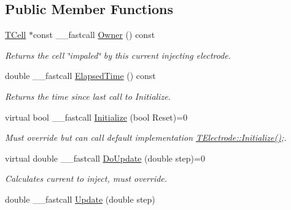 \subsection*{Public Member Functions}
\begin{DoxyCompactItemize}
\item 
\hypertarget{class_t_electrode_ae19b5798e468ff9b6c8519d391e9d2f3}{\hyperlink{class_t_cell}{T\+Cell} $\ast$const \+\_\+\+\_\+fastcall \hyperlink{class_t_electrode_ae19b5798e468ff9b6c8519d391e9d2f3}{Owner} () const }\label{class_t_electrode_ae19b5798e468ff9b6c8519d391e9d2f3}

\begin{DoxyCompactList}\small\item\em Returns the cell \char`\"{}impaled\char`\"{} by this current injecting electrode. \end{DoxyCompactList}\item 
\hypertarget{class_t_electrode_add43f5bb0a835ca9650312de714597db}{double \+\_\+\+\_\+fastcall \hyperlink{class_t_electrode_add43f5bb0a835ca9650312de714597db}{Elapsed\+Time} () const }\label{class_t_electrode_add43f5bb0a835ca9650312de714597db}

\begin{DoxyCompactList}\small\item\em Returns the time since last call to Initialize. \end{DoxyCompactList}\item 
\hypertarget{class_t_electrode_a5f5711cfc03619d470acbe5669e59930}{virtual bool \+\_\+\+\_\+fastcall \hyperlink{class_t_electrode_a5f5711cfc03619d470acbe5669e59930}{Initialize} (bool Reset)=0}\label{class_t_electrode_a5f5711cfc03619d470acbe5669e59930}

\begin{DoxyCompactList}\small\item\em Must override but can call default implementation \hyperlink{class_t_electrode_a5f5711cfc03619d470acbe5669e59930}{T\+Electrode\+::\+Initialize()};. \end{DoxyCompactList}\item 
\hypertarget{class_t_electrode_a3b535fa8d277cf8245f99900fc32ce99}{virtual double \+\_\+\+\_\+fastcall \hyperlink{class_t_electrode_a3b535fa8d277cf8245f99900fc32ce99}{Do\+Update} (double step)=0}\label{class_t_electrode_a3b535fa8d277cf8245f99900fc32ce99}

\begin{DoxyCompactList}\small\item\em Calculates current to inject, must override. \end{DoxyCompactList}\item 
\hypertarget{class_t_electrode_adf2007f7c7031a2d37d83fc87e47a214}{double \+\_\+\+\_\+fastcall \hyperlink{class_t_electrode_adf2007f7c7031a2d37d83fc87e47a214}{Update} (double step)}\label{class_t_electrode_adf2007f7c7031a2d37d83fc87e47a214}


\end{DoxyCompactItemize}
